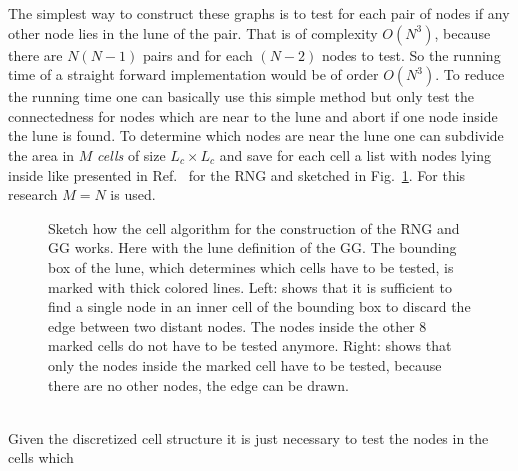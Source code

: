         The simplest way to construct these graphs is to test for each
        pair of nodes if any other node lies in
        the lune of the pair. That is of complexity \(O (N^3)\), because
        there are \(N(N-1)\) pairs and for each \((N-2)\) nodes to test. So
        the running time of a straight forward implementation would be of
        order \(O(N^3)\).
        To reduce the running time one can basically use this simple method but only test
        the connectedness for nodes which are near to the lune and abort if
        one node inside the lune is found. To determine which nodes are
        near the lune one can subdivide the area in \(M\) \emph{cells} of size
        \(L_c \times L_c\) and save for each cell a list with nodes lying
        inside like presented in Ref.\ \cite{RNGCell} for the RNG and sketched in Fig.\ \ref{fig:cell}.
        For this research \(M = N\) is used.\\
        \begin{figure}[htbp]
            \centering
            \caption[Sketch how the Cell Method works]
            {
                Sketch how the cell algorithm for the construction of the
                RNG and GG works. Here with the lune definition of the GG.
                The bounding box of the lune, which determines which cells have
                to be tested, is marked with thick colored lines.
                Left: shows that it is sufficient to find a
                single node in an inner cell of the bounding box to discard
                the edge between two distant nodes. The nodes inside the
                other 8 marked cells do not have to be tested anymore.
                Right: shows that only the nodes inside the
                marked cell have to be tested, because there are no other nodes,
                the edge can be drawn.
            }
            \label{fig:cell}
        \end{figure}\\
        Given the discretized cell structure it is just necessary to test the nodes in the cells which
